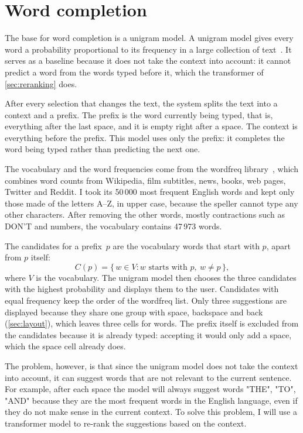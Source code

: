 \section{Word completion}
\label{sec:completion}

The base for word completion is a unigram model. A
unigram model gives every word a probability proportional to its frequency in a large
collection of text~\citep{jurafsky2009slp}. It serves as a baseline because it does not
take the context into account: it cannot predict a word from the words typed before it,
which the transformer of \cref{sec:reranking} does.

After every selection that changes the text, the system splits the text into a context
and a prefix. The prefix is the word currently being typed, that is, everything after
the last space, and it is empty right after a space. The context is everything before
the prefix. This model uses only the prefix: it completes the word being typed rather
than predicting the next one.

The vocabulary and the word frequencies come from the wordfreq
library~\citep{speer2022wordfreq}, which combines word counts from Wikipedia, film
subtitles, news, books, web pages, Twitter and Reddit. I took its 50\,000 most frequent
English words and kept only those made of the letters A--Z, in upper case, because the
speller cannot type any other characters. After removing the other words, mostly
contractions such as DON'T and numbers, the vocabulary contains 47\,973 words.

The candidates for a prefix~$p$ are the vocabulary words that start with $p$, apart
from $p$ itself:
\begin{equation}
    C(p) = \{\, w \in V : w \text{ starts with } p,\ w \neq p \,\},
    \label{eq:unigram-candidates}
\end{equation}
where $V$ is the vocabulary. The unigram model then chooses the three candidates with
the highest probability and displays them to the user. Candidates with equal frequency
keep the order of the wordfreq list. Only three suggestions are displayed because they
share one group with space, backspace and back (\cref{sec:layout}), which leaves three
cells for words. The prefix itself is excluded from the candidates because it is already
typed: accepting it would only add a space, which the space cell already does.

The problem, however, is that since the unigram model does not take the context into 
account, it can suggest words that are not relevant to the current sentence. 
For example, after each space the model will always suggest words "THE", "TO", "AND" 
because they are the most frequent words in the English language, even if they do 
not make sense in the current context. To solve this problem, I will use a transformer 
model to re-rank the suggestions based on the context.

